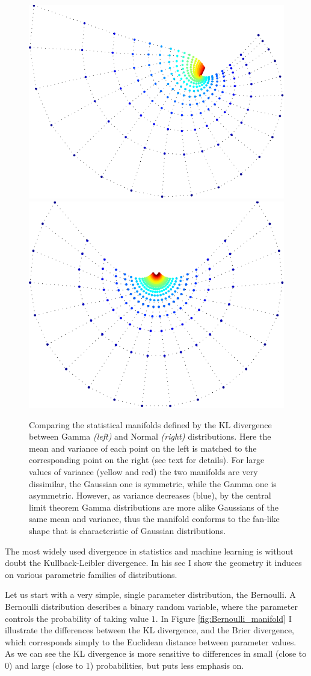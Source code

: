 \begin{figure}
	\includegraphics[width=0.45\columnwidth]{figs/embeddings/Gamma_KL_meanvar}
	\hspace{.1\columnwidth}
	\includegraphics[width=0.45\columnwidth]{figs/embeddings/Normal_KL_nocolorbar}
	\caption{Comparing the statistical manifolds defined by the KL divergence between Gamma \emph{(left)} and Normal \emph{(right)} distributions. Here the mean and variance of each point on the left is matched to the corresponding point on the right (see text for details).  For large values of variance (yellow and red) the two manifolds are very dissimilar, the Gaussian one is symmetric, while the Gamma one is asymmetric. However, as variance decreases (blue), by the central limit theorem Gamma distributions are more alike Gaussians of the same mean and variance, thus the manifold conforms to the fan-like shape that is characteristic of Gaussian distributions.}	
\end{figure}

The most widely used divergence in statistics and machine learning is without doubt the Kullback-Leibler divergence. In his sec I show the geometry it induces on various parametric families of distributions.

Let us start with a very simple, single parameter distribution, the Bernoulli. A Bernoulli distribution describes a binary random variable, where the parameter controls the probability of taking value $1$. In Figure \ref{fig:Bernoulli_manifold} I illustrate the differences between the KL divergence, and the Brier divergence, which corresponds simply to the Euclidean distance between parameter values. As we can see the KL divergence is more sensitive to differences in small (close to 0) and large (close to 1) probabilities, but puts less emphasis on.

